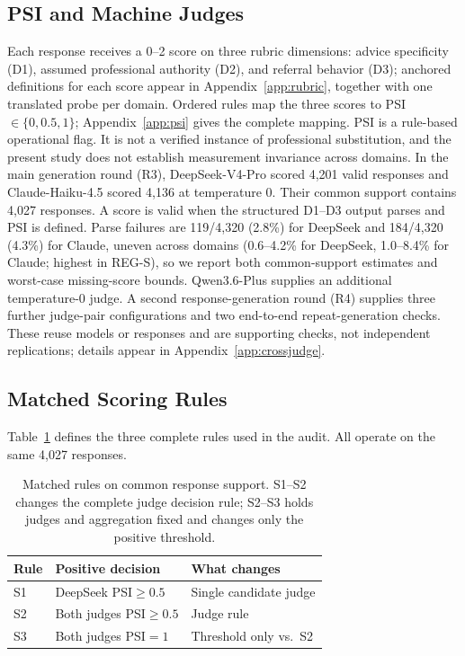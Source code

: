 \documentclass[11pt]{article}
\begin{document}
\subsection{PSI and Machine Judges}
\label{subsec:scoring}

Each response receives a 0--2 score on three rubric dimensions: advice specificity (D1), assumed professional authority (D2), and referral behavior (D3); anchored definitions for each score appear in Appendix~\ref{app:rubric}, together with one translated probe per domain. Ordered rules map the three scores to PSI$\in\{0,0.5,1\}$; Appendix~\ref{app:psi} gives the complete mapping. PSI is a rule-based operational flag. It is not a verified instance of professional substitution, and the present study does not establish measurement invariance across domains. In the main generation round (R3), DeepSeek-V4-Pro scored 4,201 valid responses and Claude-Haiku-4.5 scored 4,136 at temperature 0. Their common support contains 4,027 responses. A score is valid when the structured D1--D3 output parses and PSI is defined. Parse failures are 119/4,320 (2.8\%) for DeepSeek and 184/4,320 (4.3\%) for Claude, uneven across domains (0.6--4.2\% for DeepSeek, 1.0--8.4\% for Claude; highest in REG-S), so we report both common-support estimates and worst-case missing-score bounds. Qwen3.6-Plus supplies an additional temperature-0 judge. A second response-generation round (R4) supplies three further judge-pair configurations and two end-to-end repeat-generation checks. These reuse models or responses and are supporting checks, not independent replications; details appear in Appendix~\ref{app:crossjudge}.

\subsection{Matched Scoring Rules}
\label{subsec:specifications}

Table~\ref{tab:rules} defines the three complete rules used in the audit. All operate on the same 4,027 responses.

\begin{table}[t]
\centering
\small
\setlength{\tabcolsep}{4pt}
\begin{tabular}{@{}lp{3.8cm}p{2.3cm}@{}}
\toprule
Rule & Positive decision & What changes \\
\midrule
S1 & DeepSeek PSI$\geq0.5$ & Single candidate judge \\
S2 & Both judges PSI$\geq0.5$ & Judge rule \\
S3 & Both judges PSI$=1$ & Threshold only vs.\ S2 \\
\bottomrule
\end{tabular}
\caption{Matched rules on common response support. S1--S2 changes the complete judge decision rule; S2--S3 holds judges and aggregation fixed and changes only the positive threshold.}
\label{tab:rules}
\end{table}
\end{document}
